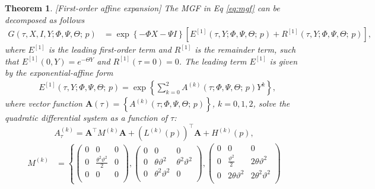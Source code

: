 \documentclass[11pt,a4paper] {article}
\newtheorem{theorem}{Theorem}[section]
\begin{document}
\begin{theorem}\label{pr:b1} [First-order affine expansion] The MGF in Eq \eqref{eq:mgf} can be decomposed as follows
\begin{equation}\label{eq:b11}
\begin{split}
G(\tau,X,I,Y; \Phi,\Psi,\Theta;\,p)&= \exp \left\{-\Phi X-\Psi I \right\}  \left[E^{[1]}(\tau,Y; \Phi,\Psi,\Theta;\,p) + R^{[1]}(\tau,Y; \Phi,\Psi,\Theta;\,p) \right],
\end{split}
\end{equation}
 where $E^{[1]}$ is the leading first-order term and $R^{[1]}$ is the remainder term, such that $E^{[1]}(0,Y)=e^{-\Theta Y}$ and $R^{[1]}(\tau=0)=0$. The leading term $E^{[1]}$ is given by the exponential-affine form
\begin{equation}\label{eq:b12}
\begin{split}
& E^{[1]}(\tau,Y; \Phi,\Psi,\Theta;\,p)= \exp \left\{\sum^{2}_{k=0}A^{(k)}(\tau;\Phi,\Psi,\Theta;\,p)Y^{k}  \right\},
\end{split}
\end{equation}
where vector function $\mathbf{A}(\tau)=\left\{A^{(k)}(\tau;\Phi,\Psi,\Theta;\,p)\right\}$, $k=0,1,2$, solve the quadratic differential system as a function of $\tau$:
\begin{equation}\label{eq:OrigMGFLogAndQVFirsOrder}
A^{(k)}_\tau=\mathbf{A}^\top M^{(k)}\mathbf{A} + \left(L^{(k)}(p)\right)^\top \mathbf{A} + H^{(k)}(p),
\end{equation}
\begin{equation*}
\begin{split}
M^{(k)}&=\left\{
\begin{pmatrix} %
0 & 0 & 0 \\
0 & \frac{\theta^2\vartheta^2}{2} & 0 \\
0 & 0 & 0 \\
\end{pmatrix}, 
\begin{pmatrix} %
0 & 0 & 0 \\
0 & \theta\vartheta^2 & \theta^2\vartheta^2 \\
0 & \theta^2\vartheta^2 & 0 \\
\end{pmatrix}, 
\begin{pmatrix} %
0 & 0 & 0 \\
0 & \frac{\vartheta^2}{2} & 2\theta\vartheta^2 \\
0 &  2\theta\vartheta^2  & 2\theta^2\vartheta^2 \\

\end{pmatrix}
\end{split}
\end{equation*}
\end{theorem}
\end{document}
